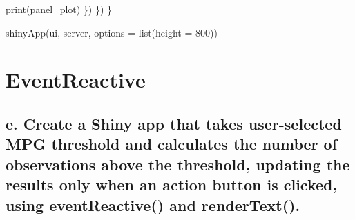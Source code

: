 \documentclass[
]{book}
\newenvironment{Shaded}{\begin{snugshade}}{\end{snugshade}}
\newcommand{\AttributeTok}[1]{\textcolor[rgb]{0.77,0.63,0.00}{#1}}
\newcommand{\DecValTok}[1]{\textcolor[rgb]{0.00,0.00,0.81}{#1}}
\newcommand{\FunctionTok}[1]{\textcolor[rgb]{0.00,0.00,0.00}{#1}}
\newcommand{\NormalTok}[1]{#1}
\begin{document}
\begin{Shaded}
\begin{Highlighting}[]
      \FunctionTok{print}\NormalTok{(panel\_plot)}
\NormalTok{    \})}
\NormalTok{  \})}
\NormalTok{\}}

\FunctionTok{shinyApp}\NormalTok{(ui, server, }\AttributeTok{options =} \FunctionTok{list}\NormalTok{(}\AttributeTok{height =} \DecValTok{800}\NormalTok{))}
\end{Highlighting}
\end{Shaded}

\hypertarget{eventreactive}{%
\section{EventReactive}\label{eventreactive}}

\hypertarget{e.-create-a-shiny-app-that-takes-user-selected-mpg-threshold-and-calculates-the-number-of-observations-above-the-threshold-updating-the-results-only-when-an-action-button-is-clicked-using-eventreactive-and-rendertext.}{%
\subsection{e. Create a Shiny app that takes user-selected MPG threshold and calculates the number of observations above the threshold, updating the results only when an action button is clicked, using eventReactive() and renderText().}\label{e.-create-a-shiny-app-that-takes-user-selected-mpg-threshold-and-calculates-the-number-of-observations-above-the-threshold-updating-the-results-only-when-an-action-button-is-clicked-using-eventreactive-and-rendertext.}}
\end{document}
